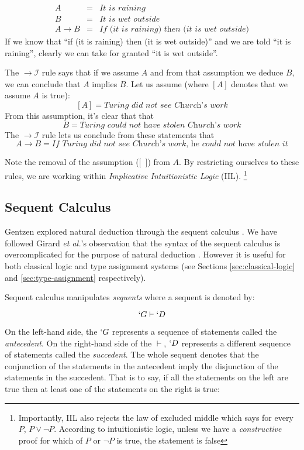   \[
  \begin{array}{lcl}
    A & = & \textit{It is raining} \\
    B & = & \textit{It is wet outside} \\
    A \to B & = & \textit{If (it is raining) then (it is wet outside)}
  \end{array}
  \]
  If we know that ``if (it is raining) then (it is wet outside)'' and we are told ``it is raining'',
  clearly we can take for granted ``it is wet outside''.
  
  The $\to\mathcal{I}$ rule says that if we assume $A$ and from that assumption we deduce $B$,
  we can conclude that $A$ implies $B$.
  Let us assume (where $[A]$ denotes that we assume $A$ is true): 
  \[
    [A] = \textit{Turing did not see Church's work} 
  \]
  From this assumption, it's clear that that 
  \[
    B = \textit{Turing could not have stolen Church's work} 
  \]
  The $\to\mathcal{I}$ rule lets us conclude from these statements that
  \[
    A \to B = \textit{If Turing did not see Church's work, he could not have stolen it}
  \]
 
  Note the removal of the assumption ([\ ]) from $A$.
  By restricting ourselves to these rules, we are working within \emph{Implicative Intuitionistic Logic} (IIL).
  \footnote{Importantly, IIL also rejects the law of excluded middle which says for every $P$, $P \lor \neg P$.
  According to intuitionistic logic, unless we have a \emph{constructive} proof for which of $P$ or $\neg P$ is true, the statement is false}
  
  \subsection{Sequent Calculus}
  
  Gentzen explored natural deduction through the sequent calculus \cite{Wadler15}.
  We have followed Girard \emph{et al.}'s observation that the syntax of the sequent calculus is overcomplicated for the purpose of natural deduction \cite{Girard89}.
  However it is useful for both classical logic and type assignment systems (see Sections \ref{sec:classical-logic} and \ref{sec:type-assignment} respectively).
  
  Sequent calculus manipulates \emph{sequents} where a sequent is denoted by:
  
    \[
      `G \vdash `D
    \]
    
  On the left-hand side, the $`G$ represents a sequence of statements called the \emph{antecedent}.
  On the right-hand side of the $\vdash$, $`D$ represents a different sequence of statements called the \emph{succedent}.
  The whole sequent denotes that the conjunction of the statements in the antecedent imply the disjunction of the statements in the succedent.
  That is to say, if all the statements on the left are true then at least one of the statements on the right is true:
  
